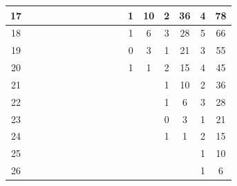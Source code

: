 \documentclass{article}
\numberwithin{equation}{section}
\begin{document}
\begin{table}[htb!]
{\begin{tabular}{|c|cc|cc|cc|cc|cc|cc|cc|cc|}
17 & \multicolumn{1}{c|}{} &  & \multicolumn{1}{c|}{} &  & \multicolumn{1}{c|}{} &  & \multicolumn{1}{c|}{} &  & \multicolumn{1}{c|}{} &  & \multicolumn{1}{c|}{1} & 10 & \multicolumn{1}{c|}{2} & 36 & \multicolumn{1}{c|}{4} & 78 \\ \hline
18 & \multicolumn{1}{c|}{} &  & \multicolumn{1}{c|}{} &  & \multicolumn{1}{c|}{} &  & \multicolumn{1}{c|}{} &  & \multicolumn{1}{c|}{} &  & \multicolumn{1}{c|}{1} & 6 & \multicolumn{1}{c|}{3} & 28 & \multicolumn{1}{c|}{5} & 66 \\ \hline
19 & \multicolumn{1}{c|}{} &  & \multicolumn{1}{c|}{} &  & \multicolumn{1}{c|}{} &  & \multicolumn{1}{c|}{} &  & \multicolumn{1}{c|}{} &  & \multicolumn{1}{c|}{0} & 3 & \multicolumn{1}{c|}{1} & 21 & \multicolumn{1}{c|}{3} & 55 \\ \hline
20 & \multicolumn{1}{c|}{} &  & \multicolumn{1}{c|}{} &  & \multicolumn{1}{c|}{} &  & \multicolumn{1}{c|}{} &  & \multicolumn{1}{c|}{} &  & \multicolumn{1}{c|}{1} & 1 & \multicolumn{1}{c|}{2} & 15 & \multicolumn{1}{c|}{4} & 45 \\ \hline
21 & \multicolumn{1}{c|}{} &  & \multicolumn{1}{c|}{} &  & \multicolumn{1}{c|}{} &  & \multicolumn{1}{c|}{} &  & \multicolumn{1}{c|}{} &  & \multicolumn{1}{c|}{} &  & \multicolumn{1}{c|}{1} & 10 & \multicolumn{1}{c|}{2} & 36 \\ \hline
22 & \multicolumn{1}{c|}{} &  & \multicolumn{1}{c|}{} &  & \multicolumn{1}{c|}{} &  & \multicolumn{1}{c|}{} &  & \multicolumn{1}{c|}{} &  & \multicolumn{1}{c|}{} &  & \multicolumn{1}{c|}{1} & 6 & \multicolumn{1}{c|}{3} & 28 \\ \hline
23 & \multicolumn{1}{c|}{} &  & \multicolumn{1}{c|}{} &  & \multicolumn{1}{c|}{} &  & \multicolumn{1}{c|}{} &  & \multicolumn{1}{c|}{} &  & \multicolumn{1}{c|}{} &  & \multicolumn{1}{c|}{0} & 3 & \multicolumn{1}{c|}{1} & 21 \\ \hline
24 & \multicolumn{1}{c|}{} &  & \multicolumn{1}{c|}{} &  & \multicolumn{1}{c|}{} &  & \multicolumn{1}{c|}{} &  & \multicolumn{1}{c|}{} &  & \multicolumn{1}{c|}{} &  & \multicolumn{1}{c|}{1} & 1 & \multicolumn{1}{c|}{2} & 15 \\ \hline
25 & \multicolumn{1}{c|}{} &  & \multicolumn{1}{c|}{} &  & \multicolumn{1}{c|}{} &  & \multicolumn{1}{c|}{} &  & \multicolumn{1}{c|}{} &  & \multicolumn{1}{c|}{} &  & \multicolumn{1}{c|}{} &  & \multicolumn{1}{c|}{1} & 10 \\ \hline
26 & \multicolumn{1}{c|}{} &  & \multicolumn{1}{c|}{} &  & \multicolumn{1}{c|}{} &  & \multicolumn{1}{c|}{} &  & \multicolumn{1}{c|}{} &  & \multicolumn{1}{c|}{} &  & \multicolumn{1}{c|}{} &  & \multicolumn{1}{c|}{1} & 6 \\ \hline

\end{tabular}}
\end{table}
\end{document}
